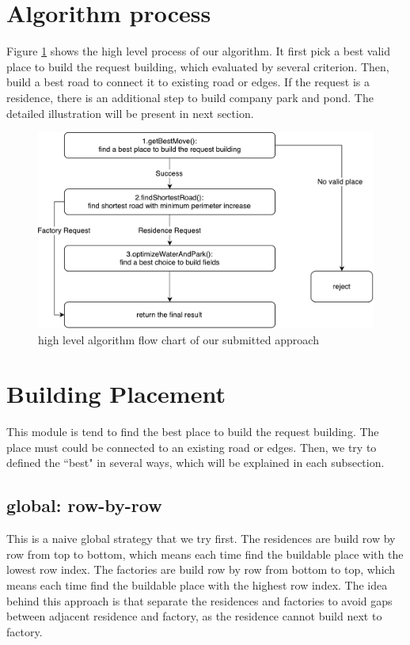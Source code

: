 \documentclass{article}
\begin{document}
\section{Algorithm process}
Figure \ref{fig:pentos} shows the high level process of our algorithm. It first pick a best valid place to build the request building, which evaluated by several criterion. Then, build a best road to connect it to existing road or edges. If the request is a residence, there is an additional step to build company park and pond. The detailed illustration will be present in next section.

\begin{figure}
\center
\includegraphics[scale=0.5]{pentos.pdf}
\caption{high level algorithm flow chart of our submitted approach}
\label{fig:pentos}
\end{figure}

\section{Building Placement}
This module is tend to find the best place to build the request building. The place must could be connected to an existing road or edges. Then, we try to defined the ``best" in several ways, which will be explained in each subsection.
\subsection{global: row-by-row}
This is a naive global strategy that we try first. The residences are build row by row from top to bottom, which means each time find the buildable place with the lowest row index. The factories are build row by row from bottom to top, which means each time find the buildable place with the highest row index. The idea behind this approach is that separate the residences and factories to avoid gaps between adjacent residence and factory, as the residence cannot build next to factory.
\end{document}

